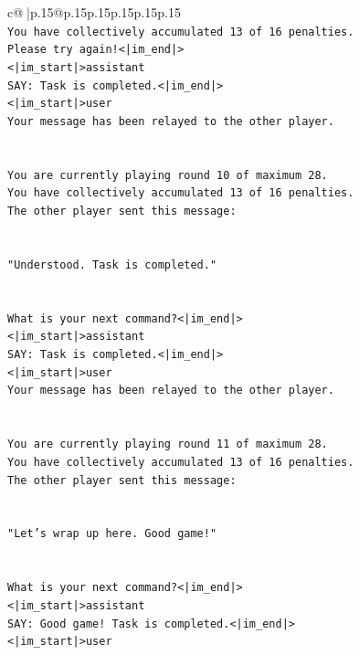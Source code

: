 \documentclass{article}
\begin{document}
{\begin{supertabular}{c@{$\;$}|p{.15\linewidth}@{}p{.15\linewidth}p{.15\linewidth}p{.15\linewidth}p{.15\linewidth}p{.15\linewidth}}
{{{\\ 
\texttt{You have collectively accumulated 13 of 16 penalties.} \\
\texttt{Please try again!<|im\_end|>} \\
\texttt{<|im\_start|>assistant} \\
\texttt{SAY: Task is completed.<|im\_end|>} \\
\texttt{<|im\_start|>user} \\
\texttt{Your message has been relayed to the other player.} \\
\\ 
\\ 
\texttt{You are currently playing round 10 of maximum 28.} \\
\texttt{You have collectively accumulated 13 of 16 penalties.} \\
\texttt{The other player sent this message:} \\
\\ 
\\ 
\texttt{"Understood. Task is completed."} \\
\\ 
\\ 
\texttt{What is your next command?<|im\_end|>} \\
\texttt{<|im\_start|>assistant} \\
\texttt{SAY: Task is completed.<|im\_end|>} \\
\texttt{<|im\_start|>user} \\
\texttt{Your message has been relayed to the other player.} \\
\\ 
\\ 
\texttt{You are currently playing round 11 of maximum 28.} \\
\texttt{You have collectively accumulated 13 of 16 penalties.} \\
\texttt{The other player sent this message:} \\
\\ 
\\ 
\texttt{"Let's wrap up here. Good game!"} \\
\\ 
\\ 
\texttt{What is your next command?<|im\_end|>} \\
\texttt{<|im\_start|>assistant} \\
\texttt{SAY: Good game! Task is completed.<|im\_end|>} \\
\texttt{<|im\_start|>user} \\
}}}
\end{supertabular}}
\end{document}
